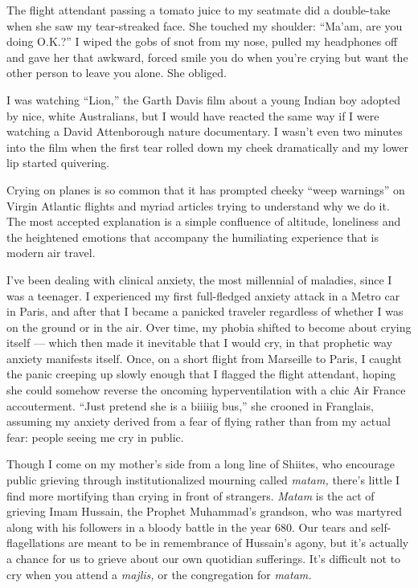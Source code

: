 The flight attendant passing a tomato juice to my seatmate did a
double-take when she saw my tear-streaked face. She touched my shoulder:
``Ma'am, are you doing O.K.?'' I wiped the gobs of snot from my nose,
pulled my headphones off and gave her that awkward, forced smile you do
when you're crying but want the other person to leave you alone. She
obliged.

I was watching ``Lion,'' the Garth Davis film about a young Indian boy
adopted by nice, white Australians, but I would have reacted the same
way if I were watching a David Attenborough nature documentary. I wasn't
even two minutes into the film when the first tear rolled down my cheek
dramatically and my lower lip started quivering.

Crying on planes is so common that it has prompted cheeky ``weep
warnings'' on Virgin Atlantic flights and myriad articles trying to
understand why we do it. The most accepted explanation is a simple
confluence of altitude, loneliness and the heightened emotions that
accompany the humiliating experience that is modern air travel.

I've been dealing with clinical anxiety, the most millennial of
maladies, since I was a teenager. I experienced my first full-fledged
anxiety attack in a Metro car in Paris, and after that I became a
panicked traveler regardless of whether I was on the ground or in the
air. Over time, my phobia shifted to become about crying itself ---
which then made it inevitable that I would cry, in that prophetic way
anxiety manifests itself. Once, on a short flight from Marseille to
Paris, I caught the panic creeping up slowly enough that I flagged the
flight attendant, hoping she could somehow reverse the oncoming
hyperventilation with a chic Air France accouterment. ``Just pretend she
is a biiiiig bus,'' she crooned in Franglais, assuming my anxiety
derived from a fear of flying rather than from my actual fear: people
seeing me cry in public.

Though I come on my mother's side from a long line of Shiites, who
encourage public grieving through institutionalized mourning called
\emph{matam,} there's little I find more mortifying than crying in front
of strangers. \emph{Matam} is the act of grieving Imam Hussain, the
Prophet Muhammad's grandson, who was martyred along with his followers
in a bloody battle in the year 680. Our tears and self-flagellations are
meant to be in remembrance of Hussain's agony, but it's actually a
chance for us to grieve about our own quotidian sufferings. It's
difficult not to cry when you attend a \emph{majlis,} or the
congregation for \emph{matam.}

